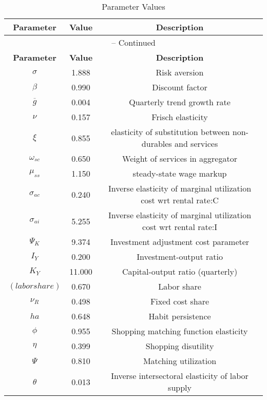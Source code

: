 \begin{center}
\begin{longtable}{ccc}
\caption{Parameter Values}\\%
\toprule%
\multicolumn{1}{c}{\textbf{Parameter}} &
\multicolumn{1}{c}{\textbf{Value}} &
 \multicolumn{1}{c}{\textbf{Description}}\\%
\midrule%
\endfirsthead
\multicolumn{3}{c}{{\tablename} \thetable{} -- Continued}\\%
\midrule%
\multicolumn{1}{c}{\textbf{Parameter}} &
\multicolumn{1}{c}{\textbf{Value}} &
  \multicolumn{1}{c}{\textbf{Description}}\\%
\midrule%
\endhead
${\sigma}$ 	 & 	 1.888 	 & 	 Risk aversion\\
${\beta}$ 	 & 	 0.990 	 & 	 Discount factor\\
${\overline{g}}$ 	 & 	 0.004 	 & 	 Quarterly trend growth rate\\
$\nu$ 	 & 	 0.157 	 & 	 Frisch elasticity\\
$\xi$ 	 & 	 0.855 	 & 	 elasticity of substitution between non-durables and services\\
$\omega_{sc}$ 	 & 	 0.650 	 & 	 Weight of services in aggregator\\
$\mu_{ss}$ 	 & 	 1.150 	 & 	 steady-state wage markup\\
${\sigma_{ac}}$ 	 & 	 0.240 	 & 	 Inverse elasticity of marginal utilization cost wrt rental rate:C\\
${\sigma_{ai}}$ 	 & 	 5.255 	 & 	 Inverse elasticity of marginal utilization cost wrt rental rate:I\\
${\Psi_{K}}$ 	 & 	 9.374 	 & 	 Investment adjustment cost parameter\\
${I_Y}$ 	 & 	 0.200 	 & 	 Investment-output ratio\\
${K_Y}$ 	 & 	 11.000 	 & 	 Capital-output ratio (quarterly)\\
$(labor share)$ 	 & 	 0.670 	 & 	 Labor share\\
${\nu_R}$ 	 & 	 0.498 	 & 	 Fixed cost share\\
${ha}$ 	 & 	 0.648 	 & 	 Habit persistence\\
${\phi}$ 	 & 	 0.955 	 & 	 Shopping matching function elasticity\\
${\eta}$ 	 & 	 0.399 	 & 	 Shopping disutility\\
${\Psi}$ 	 & 	 0.810 	 & 	 Matching utilization\\
${\theta}$ 	 & 	 0.013 	 & 	 Inverse intersectoral elasticity of labor supply\\

\end{longtable}
\end{center}
